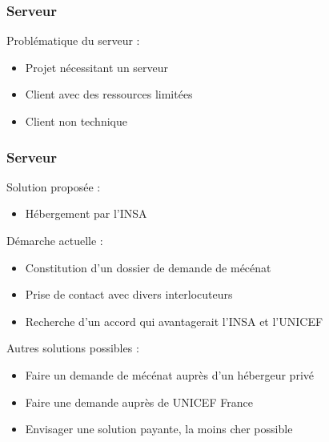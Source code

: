 \begin{frame}
	\frametitle{Serveur}

    Problématique du serveur :
      \begin{itemize}
        \item Projet nécessitant un serveur
        \item Client avec des ressources limitées
        \item Client non technique
      \end{itemize}
      
\end{frame}


\begin{frame}
	\frametitle{Serveur}
	Solution proposée :
	\begin{itemize}	
    \item Hébergement par l'INSA
    \end{itemize}
    Démarche actuelle :
      \begin{itemize}
        \item Constitution d'un dossier de demande de mécénat
        \item Prise de contact avec divers interlocuteurs
        \item Recherche d'un accord qui avantagerait l'INSA et l'UNICEF
      \end{itemize}
    Autres solutions possibles :
      \begin{itemize}
        \item Faire un demande de mécénat auprès d'un hébergeur privé
        \item Faire une demande auprès de UNICEF France
        \item Envisager une solution payante, la moins cher possible
      \end{itemize}
\end{frame}